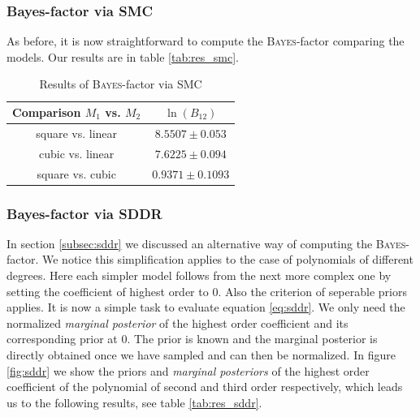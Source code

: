 \documentclass[%
 reprint,
 amsmath,amssymb,
 aps,
]{revtex4-1}
\begin{document}
\subsubsection{\textbf{Bayes-factor via SMC}}
As before, it is now straightforward to compute the \textsc{Bayes}-factor comparing the models. Our results are in table \eqref{tab:res_smc}.

\begin{table}[htbp]
	{\renewcommand{\arraystretch}{1.3}
		\begin{tabular}{|c|c|}
			\hline
			Comparison $M_1$ vs. $M_2$ & $\ln(B_{12})$  \\
			\hline
			square vs. linear& $8.5507\pm0.053$\\
			cubic vs. linear & $7.6225\pm0.094$\\
			square vs. cubic&$0.9371\pm0.1093$  \\
			\hline
	\end{tabular}}
	\caption{Results of \textsc{Bayes}-factor via SMC}
	\label{tab:res_smc}
\end{table}


\subsubsection{\textbf{Bayes-factor via SDDR}}
In section \eqref{subsec:sddr} we discussed an alternative way of computing the \textsc{Bayes}-factor. We notice this simplification applies to the case of polynomials of different degrees. Here each simpler model follows from the next more complex one by setting the coefficient of highest order to $0$. Also the criterion of seperable priors applies. It is now a simple task to evaluate equation \eqref{eq:sddr}. We only need the normalized \emph{marginal posterior} of the highest order coefficient and its corresponding prior at $0$. The prior is known and the marginal posterior is directly obtained once we have sampled and can then be normalized. In figure \eqref{fig:sddr} we show the priors and \emph{marginal posteriors} of the highest order coefficient of the polynomial of second and third order respectively, which leads us to the following results, see table \eqref{tab:res_sddr}.
\end{document}
